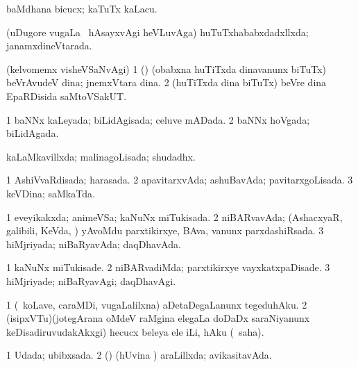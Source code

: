 {\bentry
{} 
\gl{\sakirx}
\bmng
baMdhana bicucx; kaTuTx kaLacu. 
\emng
\eentry

\bentry
{} 
\gl{\gu}
\expl{}
\bmng
(uDugore \mo vugaLa \vi\, hAsayxvAgi heVLuvAga) huTuTxhababxdadxllxda; janamxdineVtarada. 
\emng
\eentry

\bentry
{} 
\gl{\nA}
\expl{}
\bmng
(kelvomemx visheVSaNvAgi) 
\bnum
\num{1} (\hA) (obabxna huTiTxda dinavanunx biTuTx) beVrAvudeV dina; jnemxVtara dina. 
\num{2} (huTiTxda dina biTuTx) beVre dina EpaRDisida saMtoVSakUT. 
\enum
\emng
\eentry

\bentry
{} 
\gl{\gu}
\expl{}
\bmng
\bnum
\num{1} baNNx kaLeyada; biLidAgisada; celuve mADada. 
\num{2} baNNx hoVgada; biLidAgada. 
\enum
\emng
\eentry

\bentry
{} 
\gl{\gu}
\expl{}
\bmng
kaLaMkavillxda; malinagoLisada; shudadhx. 
\emng
\eentry

\bentry
{} 
\gl{\gu}
\expl{}
\bmng
\bnum
\num{1} AshiVvaRdisada; harasada. 
\num{2} apavitarxvAda; ashuBavAda; pavitarxgoLisada. 
\num{3} keVDina; saMkaTda. 
\enum
\emng
\eentry

\bentry
{} 
\gl{\gu}
\expl{}
\bmng
{} 
\emng
\eentry

\bentry
{} 
\gl{\gu}
\expl{}
\bmng
\bnum
\num{1} eveyikakxda; animeVSa; kaNuNx miTukisada. 
\num{2} niBARvavAda; (AshacxyaR, galibili, KeVda, \mo) yAvoMdu parxtikirxye, BAva, \mo vanunx parxdashiRsada. 
\num{3} hiMjriyada; niBaRyavAda; daqDhavAda. 
\enum
\emng
\eentry

\bentry
{} 
\gl{\kirxvi}
\expl{}
\bmng
\bnum
\num{1} kaNuNx miTukisade. 
\num{2} niBARvadiMda; parxtikirxye vayxkatxpaDisade. 
\num{3} hiMjriyade; niBaRyavAgi; daqDhavAgi. 
\enum
\emng
\eentry

\bentry
{} 
\gl{\sakirx}
\expl{}
\bmng
\bnum
\num{1} (\kanmu\ koLave, caraMDi, \mo vugaLalilxna) aDetaDegaLanunx tegeduhAku. 
\num{2} (isipxVTu)(jotegArana oMdeV raMgina elegaLa doDaDx saraNiyanunx keDisadiruvudakAkxgi) hecucx beleya ele iLi, hAku (\akirx\ saha). 
\enum
\emng
\eentry

\bentry
{} 
\gl{\gu}
\expl{}
\bmng
\bnum
\num{1} Udada; ubibxsada. 
\num{2} (\pArxparx) (hUvina \vi) araLillxda; avikasitavAda. 
\enum
\emng
\eentry

}
